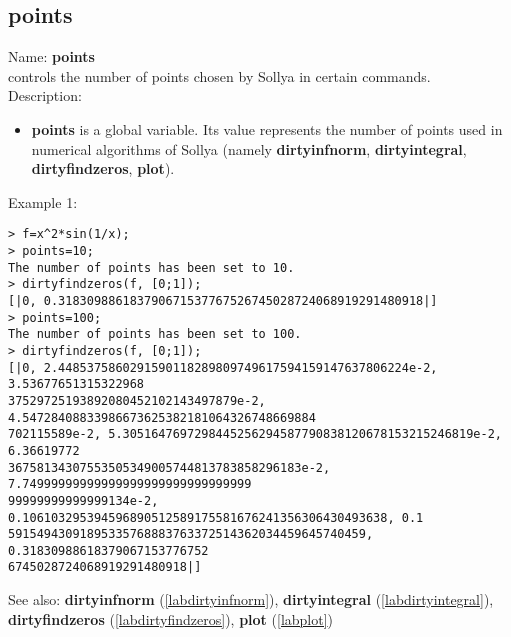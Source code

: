 \subsection{points}
\label{labpoints}
\noindent Name: \textbf{points}\\
controls the number of points chosen by Sollya in certain commands.\\

\noindent Description: \begin{itemize}

\item \textbf{points} is a global variable. Its value represents the number of points
   used in numerical algorithms of Sollya (namely \textbf{dirtyinfnorm},
   \textbf{dirtyintegral}, \textbf{dirtyfindzeros}, \textbf{plot}).
\end{itemize}
\noindent Example 1: 
\begin{center}\begin{minipage}{15cm}\begin{Verbatim}[frame=single]
> f=x^2*sin(1/x);
> points=10;
The number of points has been set to 10.
> dirtyfindzeros(f, [0;1]);
[|0, 0.318309886183790671537767526745028724068919291480918|]
> points=100;
The number of points has been set to 100.
> dirtyfindzeros(f, [0;1]);
[|0, 2.4485375860291590118289809749617594159147637806224e-2, 3.53677651315322968
37529725193892080452102143497879e-2, 4.54728408833986673625382181064326748669884
702115589e-2, 5.3051647697298445256294587790838120678153215246819e-2, 6.36619772
36758134307553505349005744813783858296183e-2, 7.74999999999999999999999999999999
99999999999999134e-2, 0.106103295394596890512589175581676241356306430493638, 0.1
59154943091895335768883763372514362034459645740459, 0.31830988618379067153776752
6745028724068919291480918|]
\end{Verbatim}
\end{minipage}\end{center}
See also: \textbf{dirtyinfnorm} (\ref{labdirtyinfnorm}), \textbf{dirtyintegral} (\ref{labdirtyintegral}), \textbf{dirtyfindzeros} (\ref{labdirtyfindzeros}), \textbf{plot} (\ref{labplot})
